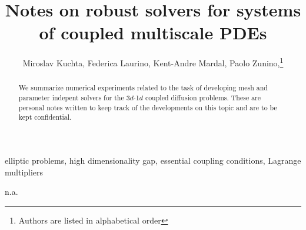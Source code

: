 \documentclass[r]{siamart171218}
\title{Notes on robust solvers for systems of coupled multiscale PDEs}
\author{
Miroslav Kuchta, Federica Laurino, Kent-Andre Mardal, Paolo Zunino,\thanks{Authors are listed in alphabetical order}
}
\begin{document}
\maketitle

\begin{abstract}
  We summarize numerical experiments related to the task of developing
  mesh and parameter indepent solvers for the 3$d$-1$d$ coupled diffusion problems.
  These are personal notes written to keep track of the developments on this
  topic and are to be kept confidential.
\end{abstract}

\begin{keywords}
elliptic problems, high dimensionality gap, essential coupling conditions, Lagrange multipliers
\end{keywords}

\begin{AMS}
n.a.
\end{AMS}


\newcommand{\MK}[1]{\textcolor{cyan}{#1}}

\newcommand{\semi}[1]{\lvert{#1}\rvert}
\newcommand{\norm}[1]{\lVert{#1}\rVert}
\newcommand{\jump}[1]{\ensuremath{[\![#1]\!]} }
\newcommand{\avg}[1]{\ensuremath{\left\{\!\left\{#1\right\}\!\right\}} }

\def\ud{u_{\odot}}
\def\vd{v_{\odot}}
\def\ld{\lambda_{\odot}}
\def\md{\mu_{\odot}}
\def\lld{l_{\odot}}
\def\uf{u_{\ominus}}
\def\up{u_{\oplus}}
\def\eps{\epsilon}
\def\nn{\boldsymbol n}
\def\rr{\boldsymbol r}
\def\RR{\boldsymbol R}
\def\kk{\boldsymbol k}
\def\ss{\boldsymbol s}
\def\uu{\boldsymbol u}
\def\vv{\boldsymbol v}
\def\xx{\boldsymbol x}
\def\bu{\overline{u}}
\def\bv{\overline{v}}
\def\tu{\widetilde{u}}
\def\tv{\widetilde{v}}
\def\TT{\boldsymbol T}
\def\NN{\boldsymbol N}
\def\BB{\boldsymbol B}
\def\ttu{\widetilde{\widetilde{u}}}
\def\ttv{\widetilde{\widetilde{v}}}
\def\cv{\check{v}}
\def\mesh{{\cal T}^h}
\def\ball{{\cal B}}
\def\R{\mathbb{R}}
\def\D{\mathcal{D}}
\def\DD{\partial\mathcal{D}}
\def\trace{{\mathcal{T}_\Gamma}}
\def\mtrace{{\overline{\mathcal{T}}_\Lambda}}
\def\ext{\mathcal{E}_\Gamma}
\def\ide{\mathcal{I}}
\def\ii{\hat{\imath}}
\newcommand{\avrd}[1]{\overline{\overline{#1}}}
\newcommand{\avrc}[1]{\overline{#1}}
\newcommand{\refe}[1]{{#1}_{\mathrm{ref}}}

\newcommand{\vertiii}[1]{{\left\vert\kern-0.25ex\left\vert\kern-0.25ex\left\vert #1 
    \right\vert\kern-0.25ex\right\vert\kern-0.25ex\right\vert}}
\end{document}
